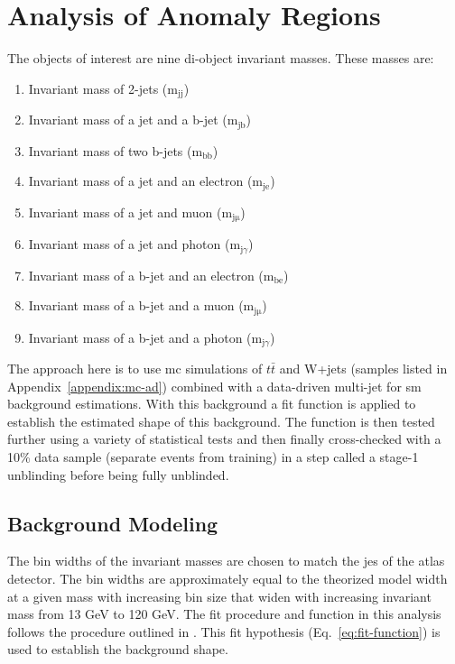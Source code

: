 \section{Analysis of Anomaly Regions}

The objects of interest are nine di-object invariant masses. These masses are:

\begin{enumerate}
    \item Invariant mass of 2-jets ($\textrm{m}_{\textrm{jj}}$)
    \item Invariant mass of a jet and a b-jet ($\textrm{m}_{\textrm{jb}}$)
    \item Invariant mass of two b-jets ($\textrm{m}_{\textrm{bb}}$)
    \item Invariant mass of a jet and an electron ($\textrm{m}_{\textrm{je}}$)
    \item Invariant mass of a jet and muon ($\textrm{m}_{\textrm{jμ}}$)
    \item Invariant mass of a jet and photon ($\textrm{m}_{\textrm{j}\gamma}$)
    \item Invariant mass of a b-jet and an electron ($\textrm{m}_{\textrm{be}}$)
    \item Invariant mass of a b-jet and a muon ($\textrm{m}_{\textrm{jμ}}$)
    \item Invariant mass of a b-jet and a photon ($\textrm{m}_{\textrm{j}\gamma}$)
\end{enumerate}

The approach here is to use \gls{mc} simulations of $t\bar{t}$ and W+jets (samples listed in Appendix~\ref{appendix:mc-ad}) combined with a data-driven multi-jet for \gls{sm} background estimations. With this background a fit function is applied to establish the 
estimated shape of this background. The function is then tested further using a variety of statistical tests and then finally cross-checked with a 10\% data sample (separate events from training) in a step 
called a stage-1 unblinding before being fully unblinded. 

\subsection{Background Modeling}

The bin widths of the invariant masses are chosen to match the \gls{jes} of the \gls{atlas} detector. The bin widths are approximately equal to the theorized model width at a given mass with increasing bin size 
that widen with increasing invariant mass from 13 GeV to 120 GeV. The fit procedure and function in this analysis follows the procedure outlined in \cite{fit-hypo}. This fit hypothesis (Eq.~\ref{eq:fit-function}) is used to establish the 
background shape.

